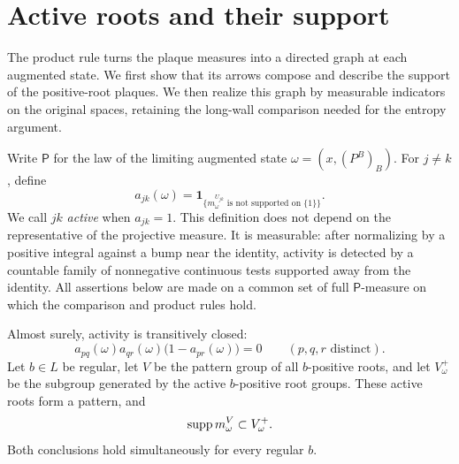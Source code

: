 \section{Active roots and their support}\label{sec:activity}

The product rule turns the plaque measures into a directed graph at each
augmented state.  We first show that its arrows compose and describe the
support of the positive-root plaques.  We then realize this graph by
measurable indicators on the original spaces, retaining the long-wall
comparison needed for the entropy argument.

Write $\mathsf P$ for the law of the limiting augmented state
$\omega=(x,(P^B)_B)$.  For $j\ne k$, define
\[
 a_{jk}(\omega)
   =\mathbf 1_{\{m^{U_{jk}}_\omega\text{ is not supported on }\{1\}\}}.
\]
We call $jk$ \emph{active} when $a_{jk}=1$.  This definition does not depend
on the representative of the projective measure.  It is measurable:
after normalizing by a positive integral against a bump near the identity,
activity is detected by a countable family of nonnegative continuous
tests supported away from the identity.  All assertions below are made
on a common set of full $\mathsf P$-measure on which the comparison and
product rules hold.

\begin{proposition}
\label{prop:activity}
Almost surely, activity is transitively closed:
\[
 a_{pq}(\omega)a_{qr}(\omega)
       \bigl(1-a_{pr}(\omega)\bigr)=0
       \qquad(p,q,r\text{ distinct}).
\]
Let $b\in L$ be regular, let $V$ be the pattern group of all
$b$-positive roots, and let $V_\omega^+$ be the subgroup generated by
the active $b$-positive root groups.  These active roots form a pattern,
and
\[
                   \operatorname{supp} m^V_\omega\subset V_\omega^+.
\]
Both conclusions hold simultaneously for every regular $b$.
\end{proposition}

